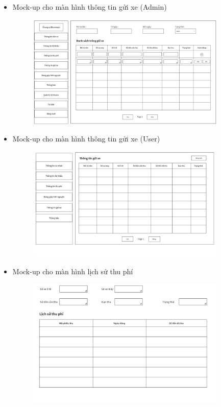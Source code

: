 \documentclass{article}
\begin{document}
\begin{itemize}
\begin{figure}[H]
    \end{figure}
    \item Mock-up cho màn hình thông tin gửi xe (Admin)
    \begin{figure}[H]
        \centering
        \includegraphics[width=0.9\textwidth]{Ảnh chương 4/Màn hình quản lý trông giữ xe.png}
    \end{figure}
    \newpage
    \item Mock-up cho màn hình thông tin gửi xe (User)
    \begin{figure}[H]
        \centering
        \includegraphics[width=0.9\textwidth]{Ảnh chương 4/Màn hình gửi xe User.png}
    \end{figure}
    \item Mock-up cho màn hình lịch sử thu phí
    \begin{figure}[H]
        \centering
        \includegraphics[width=0.9\textwidth]{Ảnh chương 4/Màn hình xem lịch sử thu phí.png}

\end{figure}
\end{itemize}
\end{document}
